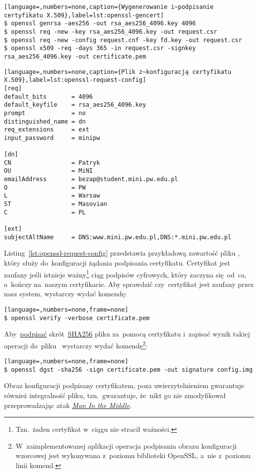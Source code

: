 \documentclass[thesis]{subfiles}
\begin{document}
\begin{minipage}{\linewidth} %
\begin{lstlisting}[language=,numbers=none,caption={Wygenerowanie i~podpisanie certyfikatu X.509},label=lst:openssl-gencert]
$ openssl genrsa -aes256 -out rsa_aes256_4096.key 4096
$ openssl req -new -key rsa_aes256_4096.key -out request.csr
$ openssl req -new -config request.cnf -key fd.key -out request.csr
$ openssl x509 -req -days 365 -in request.csr -signkey rsa_aes256_4096.key -out certificate.pem
\end{lstlisting}
\end{minipage}

\begin{lstlisting}[language=,numbers=none,caption={Plik z~konfiguracją certyfikatu X.509},label=lst:openssl-request-config]
[req]
default_bits       = 4096
default_keyfile    = rsa_aes256_4096.key
prompt             = no
distinguished_name = dn
req_extensions     = ext
input_password     = minipw

[dn]
CN                 = Patryk
OU                 = MiNI
emailAddress       = bezap@student.mini.pw.edu.pl
O                  = PW
L                  = Warsaw
ST                 = Masovian
C                  = PL

[ext]
subjectAltName     = DNS:www.mini.pw.edu.pl,DNS:*.mini.pw.edu.pl
\end{lstlisting}

Listing~\ref{lst:openssl-request-config} przedstawia przykładową zawartość pliku , który służy do~konfiguracji żądania podpisania certyfikatu. Certyfikat jest zaufany jeśli istnieje ważny\footnote{Tzn.~żaden certyfikat w~ciągu nie stracił ważności.} ciąg podpisów cyfrowych, który zaczyna się~od~\gls{ca}, a~kończy na~naszym certyfikacie. Aby sprawdzić czy~certyfikat jest zaufany przez nasz system, wystarczy wydać komendę:
\begin{lstlisting}[language=,numbers=none,frame=none]
$ openssl verify -verbose certificate.pem
\end{lstlisting}

Aby~\href{http://stackoverflow.com/questions/10782826/digital-signature-for-a-file-using-openssl}{podpisać} skrót~\href{https://en.wikipedia.org/wiki/SHA-2}{SHA256} pliku  za~pomocą certyfikatu  i~zapisać wynik takiej operacji do~pliku~ wystarczy wydać komendę\footnote{W~zaimplementowanej aplikacji operacja podpisania obrazu konfiguracji wzorcowej jest wykonywana z~poziomu biblioteki OpenSSL, a~nie z~poziomu linii komend.}:

\begin{lstlisting}[language=,numbers=none,frame=none]
$ openssl dgst -sha256 -sign certificate.pem -out signature config.img
\end{lstlisting}

Obraz konfiguracji podpisany certyfikatem, poza uwierzytelnieniem gwarantuje również integralność pliku, tzn.~gwarantuje, że~nikt go nie zmodyfikował przeprowadzając atak \emph{\hyperlink{itm:mitm}{Man In the Middle}}.
\end{document}
